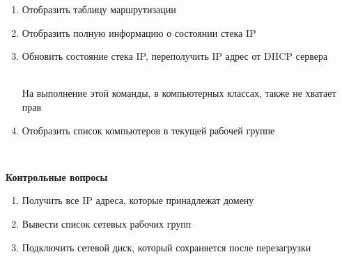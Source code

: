 \documentclass[a4paper,12pt]{article}
\begin{document}
\begin{flushleft}
\begin{enumerate} [1. ]
\begin{enumerate} [\bf a. ]
        \begin{flushleft}
        \end{flushleft}
        \item Отобразить таблицу маршрутизации
        \begin{flushleft}
        \end{flushleft}
        \item Отобразить полную информацию о состоянии стека IP
        \begin{flushleft}
        \end{flushleft}
        \item Обновить состояние стека IP, переполучить IP адрес от DHCP сервера
        \begin{flushleft}
          \\
         На выполнение этой команды, в компьютерных классах, также не хватает прав
        \end{flushleft}
        \item Отобразить список компьютеров в текущей рабочей группе
        \begin{flushleft}
          \\[1.5cm]
        \end{flushleft}
        \end{enumerate}
    \end{enumerate}

  \end{flushleft}

  \begin{center}
   {\bf Контрольные вопросы}
  \end{center}
  \begin{flushleft}
    \begin{enumerate}
     \item Получить все IP адреса, которые принадлежат домену 
      \begin{flushleft}
      \end{flushleft}
     \item Вывести список сетевых рабочих групп
      \begin{flushleft}
      \end{flushleft}
     \item Подключить сетевой диск, который сохраняется после перезагрузки
      \begin{flushleft}
         \\[1.5cm]
      \end{flushleft}
    \end{enumerate}

  \end{flushleft}
\end{document}
